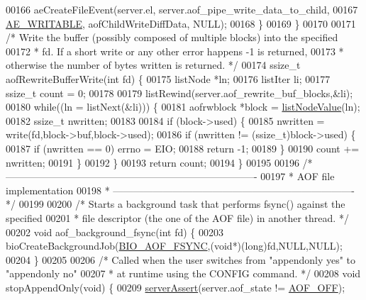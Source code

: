 \begin{DoxyCode}
{00166         aeCreateFileEvent(server.el, server.aof\_pipe\_write\_data\_to\_child,
00167             \hyperlink{ae_8h_ab6bfb0366ccb6277112d132c2a2bf500}{AE\_WRITABLE}, aofChildWriteDiffData, NULL);
00168     \}
00169 \}
00170 
00171 \textcolor{comment}{/* Write the buffer (possibly composed of multiple blocks) into the specified}
00172 \textcolor{comment}{ * fd. If a short write or any other error happens -1 is returned,}
00173 \textcolor{comment}{ * otherwise the number of bytes written is returned. */}
00174 ssize\_t aofRewriteBufferWrite(\textcolor{keywordtype}{int} fd) \{
00175     listNode *ln;
00176     listIter li;
00177     ssize\_t count = 0;
00178 
00179     listRewind(server.aof\_rewrite\_buf\_blocks,&li);
00180     \textcolor{keywordflow}{while}((ln = listNext(&li))) \{
00181         aofrwblock *block = \hyperlink{adlist_8h_af84cae230e7180ebcda1e2736fce9f65}{listNodeValue}(ln);
00182         ssize\_t nwritten;
00183 
00184         \textcolor{keywordflow}{if} (block->used) \{
00185             nwritten = write(fd,block->buf,block->used);
00186             \textcolor{keywordflow}{if} (nwritten != (ssize\_t)block->used) \{
00187                 \textcolor{keywordflow}{if} (nwritten == 0) errno = EIO;
00188                 \textcolor{keywordflow}{return} -1;
00189             \}
00190             count += nwritten;
00191         \}
00192     \}
00193     \textcolor{keywordflow}{return} count;
00194 \}
00195 
00196 \textcolor{comment}{/* ----------------------------------------------------------------------------}
00197 \textcolor{comment}{ * AOF file implementation}
00198 \textcolor{comment}{ * ------------------------------------------------------------------------- */}
00199 
00200 \textcolor{comment}{/* Starts a background task that performs fsync() against the specified}
00201 \textcolor{comment}{ * file descriptor (the one of the AOF file) in another thread. */}
00202 \textcolor{keywordtype}{void} aof\_background\_fsync(\textcolor{keywordtype}{int} fd) \{
00203     bioCreateBackgroundJob(\hyperlink{bio_8h_a5d03c967316addafc61b7ed5d957984f}{BIO\_AOF\_FSYNC},(\textcolor{keywordtype}{void}*)(\textcolor{keywordtype}{long})fd,NULL,NULL);
00204 \}
00205 
00206 \textcolor{comment}{/* Called when the user switches from "appendonly yes" to "appendonly no"}
00207 \textcolor{comment}{ * at runtime using the CONFIG command. */}
00208 \textcolor{keywordtype}{void} stopAppendOnly(\textcolor{keywordtype}{void}) \{
00209     \hyperlink{server_8h_a88114b5169b4c382df6b56506285e56a}{serverAssert}(server.aof\_state != \hyperlink{server_8h_a5226306fbcebcb6d5d02e0fef3c213c2}{AOF\_OFF});
}
\end{DoxyCode}
